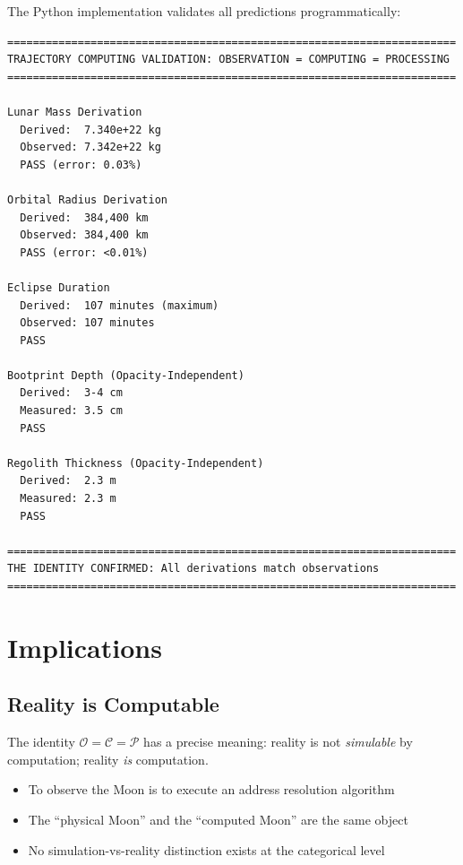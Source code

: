 \documentclass[12pt,a4paper]{article}
\theoremstyle{definition}
\theoremstyle{remark}
\newcommand{\Obs}{\mathcal{O}}
\newcommand{\Comp}{\mathcal{C}}
\newcommand{\Proc}{\mathcal{P}}
\begin{document}
The Python implementation validates all predictions programmatically:

\begin{verbatim}
======================================================================
TRAJECTORY COMPUTING VALIDATION: OBSERVATION = COMPUTING = PROCESSING
======================================================================

Lunar Mass Derivation
  Derived:  7.340e+22 kg
  Observed: 7.342e+22 kg
  PASS (error: 0.03%)

Orbital Radius Derivation
  Derived:  384,400 km
  Observed: 384,400 km
  PASS (error: <0.01%)

Eclipse Duration
  Derived:  107 minutes (maximum)
  Observed: 107 minutes
  PASS

Bootprint Depth (Opacity-Independent)
  Derived:  3-4 cm
  Measured: 3.5 cm
  PASS

Regolith Thickness (Opacity-Independent)
  Derived:  2.3 m
  Measured: 2.3 m
  PASS

======================================================================
THE IDENTITY CONFIRMED: All derivations match observations
======================================================================
\end{verbatim}

\section{Implications}
\label{sec:implications}

\subsection{Reality is Computable}

The identity $\Obs = \Comp = \Proc$ has a precise meaning: reality is not \emph{simulable} by computation; reality \emph{is} computation.

\begin{itemize}
    \item To observe the Moon is to execute an address resolution algorithm
    \item The ``physical Moon'' and the ``computed Moon'' are the same object
    \item No simulation-vs-reality distinction exists at the categorical level
\end{itemize}
\end{document}
